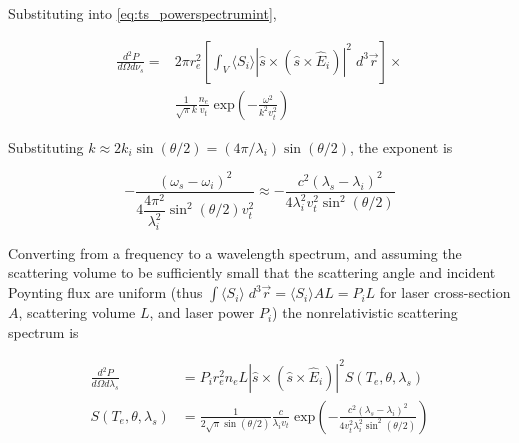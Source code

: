 \noindent Substituting into \cref{eq:ts_powerspectrumint},

\begin{equation}\label{eq:ts_powerspectrimint2}
 \begin{aligned}
 \frac{d^2 P}{d\Omega d\nu_s} = &2\pi r_e^2 \left[ \int_V \langle S_i \rangle \left| \hat{s} \times \left( \hat{s} \times \hat{E}_i \right) \right|^2 \;d^3 \vec{r} \right] \times\\ &\frac{1}{\sqrt{\pi}k} \frac{n_e}{v_t} \;\mbox{exp}\left(-\frac{\omega^2}{k^2 v_t^2} \right)
 \end{aligned}
\end{equation}

\noindent Substituting $k \approx 2k_i \sin(\theta/2) = \left(4\pi/\lambda_i\right) \sin(\theta/2)$, the exponent is

\begin{equation}\label{eq:ts_exp}
 -\frac{(\omega_s - \omega_i)^2}{4\dfrac{4\pi^2}{\lambda_i^2} \sin^2 \left(\theta/2\right) v_t^2} \approx -\frac{c^2 (\lambda_s - \lambda_i)^2}{4\lambda_i^2 v_t^2 \sin^2(\theta/2)}
\end{equation}

\noindent Converting from a frequency to a wavelength spectrum, and assuming the scattering volume to be sufficiently small that the scattering angle and incident Poynting flux are uniform (thus $\int \langle S_i \rangle \;d^3\vec{r} = \langle S_i \rangle AL = P_i L$ for laser cross-section $A$, scattering volume $L$, and laser power $P_i$) the nonrelativistic scattering spectrum is


\begin{equation}\label{eq:ts_spectrum_nonrel}
 \begin{aligned}
  \frac{d^2 P}{d\Omega d\lambda_s} &= P_i r_e^2 n_e L \left| \hat{s} \times \left( \hat{s} \times \hat{E}_i \right) \right|^2 S(T_e, \theta, \lambda_s)\\
  S(T_e,\theta,\lambda_s) &= \frac{1}{2\sqrt{\pi} \sin(\theta/2)} \frac{c}{\lambda_i v_t} \;\mbox{exp}\left(-\frac{c^2 (\lambda_s - \lambda_i)^2}{4v_t^2 \lambda_i^2 \sin^2 (\theta/2)}\right)
 \end{aligned}
\end{equation}

